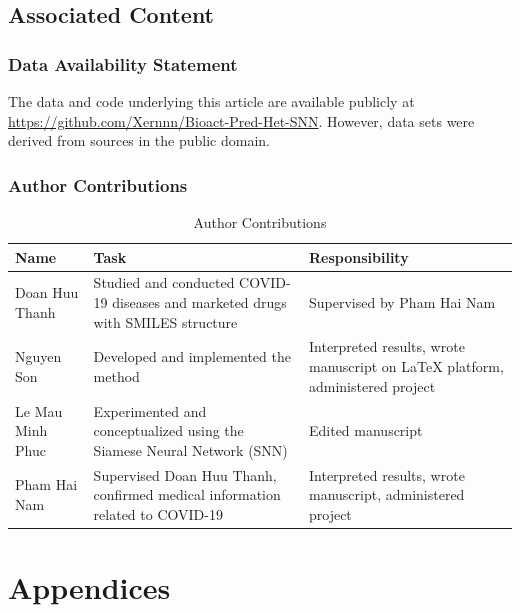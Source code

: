 \documentclass[conference]{IEEEtran}
\begin{document}
\subsection*{Associated Content}
\subsubsection*{Data Availability Statement}
The data and code underlying this article are available publicly at \url{https://github.com/Xernnn/Bioact-Pred-Het-SNN}. However, data sets were derived from sources in the public domain.\\

\subsubsection*{Author Contributions}
\begin{table}[h!]
  \centering
  \caption{Author Contributions}
  \label{tab:Author Contributions}
  \begin{tabular}{|>{\centering\arraybackslash}m{2cm}|>{\centering\arraybackslash}m{3cm}|>{\centering\arraybackslash}m{3cm}|}
    \hline
    \textbf{Name}    & \textbf{Task}                                                                    & \textbf{Responsibility}                                                       \\ \hline
    Doan Huu Thanh   & Studied and conducted COVID-19 diseases and marketed drugs with SMILES structure & Supervised by Pham Hai Nam                                                    \\ \hline
    Nguyen Son       & Developed and implemented the method                                             & Interpreted results, wrote manuscript on LaTeX platform, administered project \\ \hline
    Le Mau Minh Phuc & Experimented and conceptualized using the Siamese Neural Network (SNN)           & Edited manuscript                                                             \\ \hline
    Pham Hai Nam     & Supervised Doan Huu Thanh, confirmed medical information related to COVID-19     & Interpreted results, wrote manuscript, administered project                   \\ \hline
  \end{tabular}
\end{table}


\clearpage

\onecolumn
\section*{Appendices}
\end{document}

